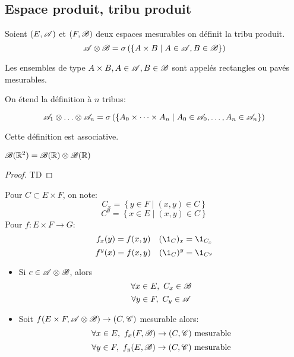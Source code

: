 \subsection{Espace produit, tribu produit}

\begin{definition}
	Soient $(E,\mathscr{A})$ et $(F,\mathscr{B})$ deux espaces mesurables on définit la tribu produit.
	$$\mathscr{A} \otimes \mathscr{B} = \sigma \left(\left\{ A \times B \mid A\in \mathscr{A}, B \in \mathscr{B} \right\}\right)$$
\end{definition}

\begin{remarque}
	Les ensembles de type $A\times B, A\in \mathscr{A}, B\in\mathscr{B}$ sont appelés rectangles ou pavés mesurables.
\end{remarque}


\begin{definition}
	On étend la définition à $n$ tribus:

	$$\triA_1 \xor \dots \xor \triA_n = \sigma \left(\left\{ A_0 \times \dots \times A_n \mid A_0\in \triA_0, \dots , A_n \in \triA_n \right\}\right)$$

	Cette définition est associative.
\end{definition}

\begin{prop}
	$\mathscr{B}(\mathbb{R}^2) = \mathscr{B}(\mathbb{R}) \otimes \mathscr{B}(\mathbb{R})$
\end{prop}

\begin{proof}
    TD %
\end{proof}

\begin{notation}
	Pour $C \subset E \times F$, on note:
	$$ C_x = \left\{ y \in F \mid (x,y) \in C \right\} $$
	$$ C^y = \left\{ x \in E \mid (x,y) \in C \right\} $$
	Pour $f: E \times F \to G$:
	$$f_x(y) = f(x,y) \quad (\1_C)_x = \1_{C_x}$$
	$$f^y(x) = f(x,y) \quad (\1_C)^y = \1_{C^y} $$
\end{notation}

\begin{prop}
	\begin{itemize}
		\item Si $c \in \mathscr{A} \otimes \mathscr{B}$, alors
		      $$\forall x \in E,\ C_x \in \mathscr{B}$$
		      $$\forall y \in F,\ C_y \in \mathscr{A}$$
		\item Soit $f (E\times F, \mathscr{A} \otimes \mathscr{B}) \to (C, \mathscr{C})$ mesurable alors:
		      $$\forall x \in E, \ f_x (F, \mathscr{B})  \to (C, \mathscr{C}) \text{ mesurable}$$
		      $$\forall y \in F, \ f_y (E, \mathscr{B})  \to (C, \mathscr{C}) \text{ mesurable}$$
	\end{itemize}
\end{prop}


